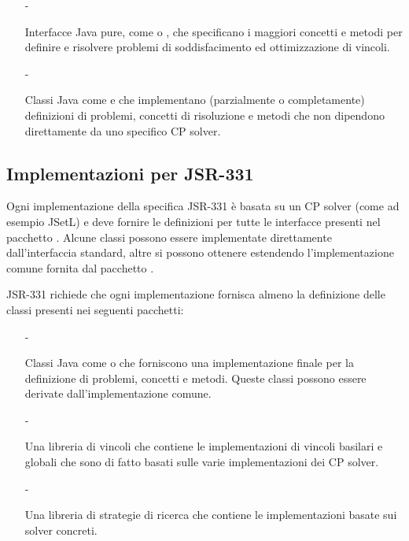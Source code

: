 \begin{itemize}
\item[-] 

Interfacce Java pure, come  o
, che specificano i maggiori concetti e metodi per definire e 
risolvere problemi di soddisfacimento ed ottimizzazione di vincoli.

\item[-]

Classi Java come  e 
 che implementano (parzialmente o completamente)
definizioni di problemi, concetti di risoluzione e metodi che non
dipendono direttamente da uno specifico CP solver.
\end{itemize}

\subsection{Implementazioni per JSR-331}
Ogni implementazione della specifica JSR-331 è basata su un 
CP solver (come ad esempio JSetL) e deve fornire le definizioni per tutte le
interfacce presenti nel pacchetto .
Alcune classi possono essere implementate direttamente dall'interfaccia
standard, altre si possono ottenere estendendo l'implementazione comune
fornita dal pacchetto . 

JSR-331 richiede
che ogni implementazione fornisca almeno la definizione delle classi
presenti nei seguenti pacchetti:
\begin{itemize}
\item[-]

Classi Java come  o  
che forniscono
una implementazione finale per la definizione di problemi, concetti
e metodi. Queste classi possono essere derivate dall'implementazione
comune.

\item[-]

Una libreria di vincoli che contiene
le implementazioni di vincoli basilari e globali che sono di fatto basati
sulle varie implementazioni dei CP solver.

\item[-]

Una libreria di strategie di ricerca che contiene 
le implementazioni basate sui solver concreti.
\end{itemize}

